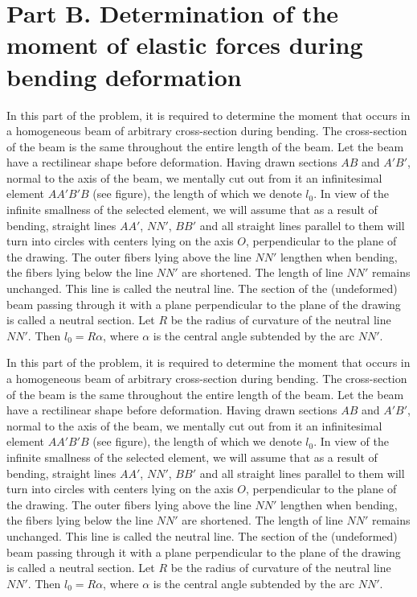 \documentclass[11pt,a4paper]{article}
\begin{document}
\section*{Part B. Determination of the moment of elastic forces during bending deformation}

In this part of the problem, it is required to determine the moment that occurs in a homogeneous beam of arbitrary cross-section during bending. The cross-section of the beam is the same throughout the entire length of the beam. Let the beam have a rectilinear shape before deformation. Having drawn sections $AB$ and $A'B'$, normal to the axis of the beam, we mentally cut out from it an infinitesimal element $AA'B'B$ (see figure), the length of which we denote $l_0$. In view of the infinite smallness of the selected element, we will assume that as a result of bending, straight lines $AA'$, $NN'$, $BB'$ and all straight lines parallel to them will turn into circles with centers lying on the axis $O$, perpendicular to the plane of the drawing. The outer fibers lying above the line $NN'$ lengthen when bending, the fibers lying below the line $NN'$ are shortened. The length of line $NN'$ remains unchanged. This line is called the neutral line. The section of the (undeformed) beam passing through it with a plane perpendicular to the plane of the drawing is called a neutral section. Let $R$ be the radius of curvature of the neutral line $NN'$. Then $l_0=R \alpha$, where $\alpha$ is the central angle subtended by the arc $NN'$.

In this part of the problem, it is required to determine the moment that occurs in a homogeneous beam of arbitrary cross-section during bending. The cross-section of the beam is the same throughout the entire length of the beam. Let the beam have a rectilinear shape before deformation. Having drawn sections $AB$ and $A'B'$, normal to the axis of the beam, we mentally cut out from it an infinitesimal element $AA'B'B$ (see figure), the length of which we denote $l_0$. In view of the infinite smallness of the selected element, we will assume that as a result of bending, straight lines $AA'$, $NN'$, $BB'$ and all straight lines parallel to them will turn into circles with centers lying on the axis $O$, perpendicular to the plane of the drawing. The outer fibers lying above the line $NN'$ lengthen when bending, the fibers lying below the line $NN'$ are shortened. The length of line $NN'$ remains unchanged. This line is called the neutral line. The section of the (undeformed) beam passing through it with a plane perpendicular to the plane of the drawing is called a neutral section. Let $R$ be the radius of curvature of the neutral line $NN'$. Then $l_0=R \alpha$, where $\alpha$ is the central angle subtended by the arc $NN'$.
\end{document}
